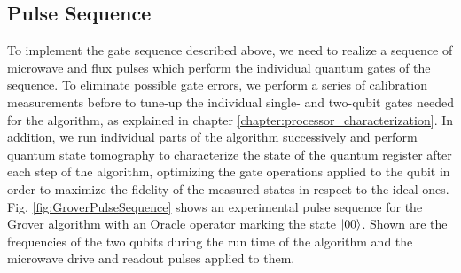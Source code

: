 \subsection{Pulse Sequence}

To implement the gate sequence described above, we need to realize a sequence of microwave and flux pulses which perform the individual quantum gates of the sequence. To eliminate possible gate errors, we perform a series of calibration measurements before to tune-up the individual single- and two-qubit gates needed for the algorithm, as explained in chapter \ref{chapter:processor_characterization}. In addition, we run individual parts of the algorithm successively and perform quantum state tomography to characterize the state of the quantum register after each step of the algorithm, optimizing the gate operations applied to the qubit in order to maximize the fidelity of the measured states in respect to the ideal ones. Fig. \ref{fig:GroverPulseSequence} shows an experimental pulse sequence for the Grover algorithm with an Oracle operator marking the state $\left| 00 \right>$. Shown are the frequencies of the two qubits during the run time of the algorithm and the microwave drive and readout pulses applied to them.

